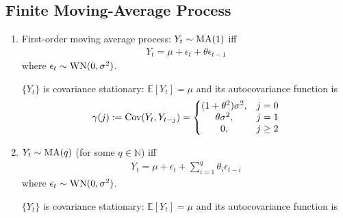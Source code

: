 \documentclass[11pt]{elegantbook}
\begin{document}
\subsection{Finite Moving-Average Process}
\begin{definition}
    \begin{enumerate}
        \item First-order moving average process: $Y_t\sim \textnormal{MA}(1)$ iff
        \begin{equation}
            \begin{aligned}
                Y_t=\mu+\epsilon_t+\theta\epsilon_{t-1}
            \end{aligned}
            \nonumber
        \end{equation}
        where $\epsilon_t\sim \textnormal{WN}(0,\sigma^2)$.
        \begin{claim}
            $\{Y_t\}$ is covariance stationary: $\mathbb{E}[Y_t]=\mu$ and its autocovariance function is
            \begin{equation}
                \begin{aligned}
                    \gamma(j):=\textnormal{Cov}(Y_t,Y_{t-j})=\left\{\begin{matrix}
                        (1+\theta^2)\sigma^2,&j=0\\
                        \theta\sigma^2,&j=1\\
                        0,&j\geq 2
                    \end{matrix}\right.
                \end{aligned}
                \nonumber
            \end{equation}
        \end{claim}
        \item $Y_t\sim \textnormal{MA}(q)$ (for some $q\in \mathbb{N}$) iff
        \begin{equation}
            \begin{aligned}
                Y_t=\mu+\epsilon_t+\sum_{i=1}^{q}\theta_i\epsilon_{t-i}
            \end{aligned}
            \nonumber
        \end{equation}
        where $\epsilon_t\sim \textnormal{WN}(0,\sigma^2)$.
        \begin{claim}
            $\{Y_t\}$ is covariance stationary: $\mathbb{E}[Y_t]=\mu$ and its autocovariance function is
            \begin{equation}
                \begin{aligned}

\end{aligned}
\end{equation}
\end{claim}
\end{enumerate}
\end{definition}
\end{document}
